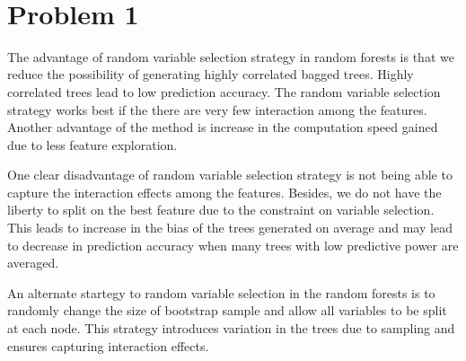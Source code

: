 \documentclass[11pt]{article}
\begin{document}
\begin{center}

\ \\
\end{center}

\section*{Problem 1}

\vspace{5 mm}
\noindent
The advantage of random variable selection strategy in random forests is that
we reduce the possibility of generating highly correlated bagged trees. Highly
correlated trees lead to low prediction accuracy. The random variable selection 
strategy works best if the there are very few interaction among the features. Another
advantage of the method is increase in the computation speed gained due to
less feature exploration. 

One clear disadvantage of random variable selection strategy is not being able to 
capture the interaction effects among the features. Besides, we do not have the
liberty to split on the best feature due to the constraint on variable selection. This 
leads to increase in the bias of the trees generated on average and may lead to
decrease in prediction accuracy when many trees with low predictive power are 
averaged.

An alternate startegy to random variable selection in the random forests is to 
randomly change the size of bootstrap sample and allow all variables to be split at 
each node. This strategy introduces variation in the trees due to sampling and 
ensures capturing interaction effects. 


\vspace{5 mm}
\noindent
\end{document}
